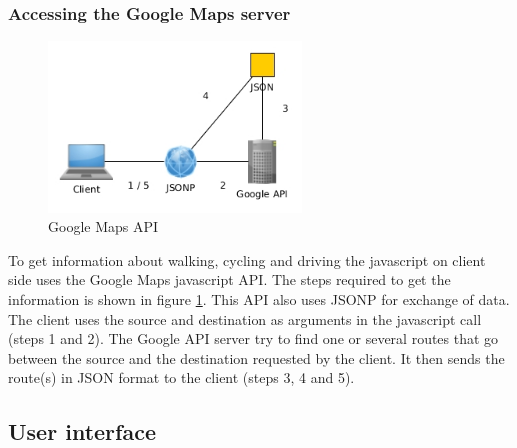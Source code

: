 \documentclass[10pt,a4paper]{article}
\begin{document}
\subsubsection{Accessing the Google Maps server}
\label{sec:access-google-maps}
\begin{figure}
\centering
\includegraphics[width=0.6\textwidth]{../google/access}
\caption{Google Maps API}
\label{fig:google}
\end{figure}
To get information about walking, cycling and driving the javascript on client side uses the Google Maps javascript API. The steps required to get the information is shown in figure \ref{fig:google}. This API also uses JSONP for exchange of data. The client uses the source and destination as arguments in the javascript call (steps 1 and 2). The Google API server try to find one or several routes that go between the source and the destination requested by the client. It then sends the route(s) in JSON format to the client (steps 3, 4 and 5).



\subsection{User interface}
\label{sec:user_inter}
\end{document}
